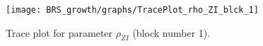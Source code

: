 \begin{figure}[H]
\centering
  \texttt{[image: BRS\_growth/graphs/TracePlot\_rho\_ZI\_blck\_1]}\\
    \caption{Trace plot for parameter ${\rho_{ZI}}$ (block number 1).}
\end{figure}
